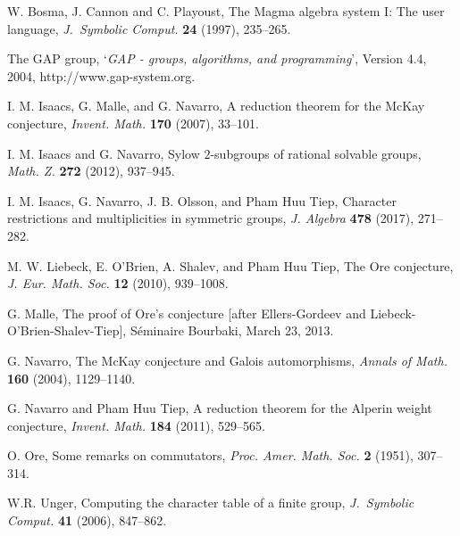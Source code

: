 \begin{thebibliography}{ABCD}

 W. Bosma, J. Cannon and 
 C. Playoust,
The {\sc Magma} algebra system I: The user language,
\emph{J.\ Symbolic Comput.} {\bf 24} (1997), 235--265.   

The GAP group, `{\it {\sf GAP} - groups, algorithms, and
programming}', Version 4.4, 
2004,
{\sf http://www.gap-system.org}.

  I. M. Isaacs, G. Malle, and G. Navarro, A reduction theorem for the
McKay conjecture, {\it Invent. Math.} {\bf 170} (2007), 33--101.

  I. M. Isaacs and G. Navarro, Sylow $2$-subgroups of rational solvable groups, {\it Math. Z.} {\bf 272} (2012), 937--945.
  
  I. M. Isaacs, G. Navarro, J. B. Olsson, and Pham Huu Tiep, Character restrictions and multiplicities in symmetric groups, 
{\it J. Algebra} {\bf 478} (2017), 271--282.

  M. W. Liebeck, E. O'Brien, A. Shalev, and Pham Huu Tiep,
The Ore conjecture, {\it J. Eur. Math. Soc.} {\bf 12} (2010), 939--1008.

  G. Malle, The proof of Ore's conjecture [after Ellers-Gordeev and 
Liebeck-O'Brien-Shalev-Tiep], S\'eminaire  Bourbaki, March 23, 2013.

  G. Navarro, The McKay conjecture
and Galois automorphisms, {\it Annals of Math.} {\bf 160} (2004), 1129--1140.

  G. Navarro and Pham Huu Tiep, A reduction theorem for the
Alperin weight conjecture, {\it Invent. Math.} {\bf 184} (2011), 529--565.

 O. Ore, Some remarks on commutators, 
{\it Proc. Amer. Math. Soc.} {\bf 2} (1951), 307--314. 

 W.R. Unger,
Computing the character table of a finite group,
{\it J.\ Symbolic Comput.}  {\bf 41}  (2006),  847--862.

\end{thebibliography}
%







